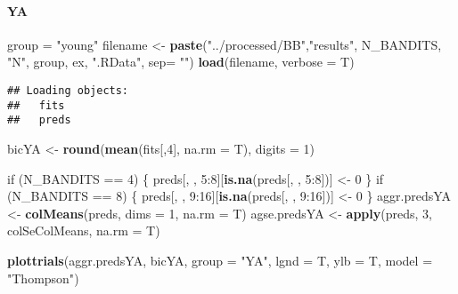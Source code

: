\documentclass[11pt,,]{article}
\newenvironment{Shaded}{\begin{snugshade}}{\end{snugshade}}
\newcommand{\KeywordTok}[1]{\textcolor[rgb]{0.13,0.29,0.53}{\textbf{{#1}}}}
\newcommand{\DataTypeTok}[1]{\textcolor[rgb]{0.13,0.29,0.53}{{#1}}}
\newcommand{\DecValTok}[1]{\textcolor[rgb]{0.00,0.00,0.81}{{#1}}}
\newcommand{\StringTok}[1]{\textcolor[rgb]{0.31,0.60,0.02}{{#1}}}
\newcommand{\NormalTok}[1]{{#1}}
\let\oldparagraph\paragraph
\renewcommand{\paragraph}[1]{\oldparagraph{#1}\mbox{}}
\begin{document}
\paragraph{YA}\label{ya}

\begin{Shaded}
\begin{Highlighting}[]
\NormalTok{group =}\StringTok{ "young"}
\NormalTok{filename  <-}\StringTok{ }\KeywordTok{paste}\NormalTok{(}\StringTok{"../processed/BB"}\NormalTok{,}\StringTok{"results"}\NormalTok{, N_BANDITS, }\StringTok{"N"}\NormalTok{, }
    \NormalTok{group, ex, }\StringTok{".RData"}\NormalTok{, }\DataTypeTok{sep=} \StringTok{""}\NormalTok{)}
\KeywordTok{load}\NormalTok{(filename, }\DataTypeTok{verbose =} \NormalTok{T)}
\end{Highlighting}
\end{Shaded}

\begin{verbatim}
## Loading objects:
##   fits
##   preds
\end{verbatim}

\begin{Shaded}
\begin{Highlighting}[]
\NormalTok{bicYA <-}\StringTok{ }\KeywordTok{round}\NormalTok{(}\KeywordTok{mean}\NormalTok{(fits[,}\DecValTok{4}\NormalTok{], }\DataTypeTok{na.rm =} \NormalTok{T), }\DataTypeTok{digits =} \DecValTok{1}\NormalTok{)}

\NormalTok{if (N_BANDITS ==}\StringTok{ }\DecValTok{4}\NormalTok{) \{}
    \NormalTok{preds[, , }\DecValTok{5}\NormalTok{:}\DecValTok{8}\NormalTok{][}\KeywordTok{is.na}\NormalTok{(preds[, , }\DecValTok{5}\NormalTok{:}\DecValTok{8}\NormalTok{])] <-}\StringTok{ }\DecValTok{0}
\NormalTok{\}}
\NormalTok{if (N_BANDITS ==}\StringTok{ }\DecValTok{8}\NormalTok{) \{}
    \NormalTok{preds[, , }\DecValTok{9}\NormalTok{:}\DecValTok{16}\NormalTok{][}\KeywordTok{is.na}\NormalTok{(preds[, , }\DecValTok{9}\NormalTok{:}\DecValTok{16}\NormalTok{])] <-}\StringTok{ }\DecValTok{0}
\NormalTok{\}}
\NormalTok{aggr.predsYA <-}\StringTok{ }\KeywordTok{colMeans}\NormalTok{(preds, }\DataTypeTok{dims =} \DecValTok{1}\NormalTok{, }\DataTypeTok{na.rm =} \NormalTok{T) }
\NormalTok{agse.predsYA <-}\StringTok{ }\KeywordTok{apply}\NormalTok{(preds, }\DecValTok{3}\NormalTok{, colSeColMeans, }\DataTypeTok{na.rm =} \NormalTok{T) }
\end{Highlighting}
\end{Shaded}

\begin{Shaded}
\begin{Highlighting}[]
\KeywordTok{plottrials}\NormalTok{(aggr.predsYA, bicYA, }\DataTypeTok{group =} \StringTok{"YA"}\NormalTok{, }\DataTypeTok{lgnd =} \NormalTok{T, }\DataTypeTok{ylb =} \NormalTok{T, }\DataTypeTok{model =} \StringTok{"Thompson"}\NormalTok{)}
\end{Highlighting}
\end{Shaded}
\end{document}
